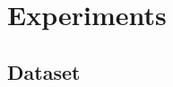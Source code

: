 \documentclass[journal]{IEEEtran}
\begin{document}


\section{Experiments}

\subsection{Dataset}
\end{document}
